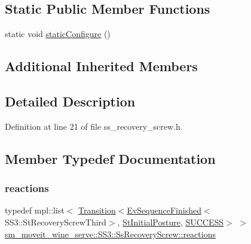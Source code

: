 \subsection*{Static Public Member Functions}
\begin{DoxyCompactItemize}
\item 
static void \hyperlink{structsm__moveit__wine__serve_1_1SS3_1_1SsRecoveryScrew_a8abad53b2989f3d9063e268b95874401}{static\+Configure} ()
\end{DoxyCompactItemize}
\subsection*{Additional Inherited Members}


\subsection{Detailed Description}


Definition at line 21 of file ss\+\_\+recovery\+\_\+screw.\+h.



\subsection{Member Typedef Documentation}
\mbox{\label{structsm__moveit__wine__serve_1_1SS3_1_1SsRecoveryScrew_ad51fd98af4a0552d56655b0f289c0bca}} 
\subsubsection{\texorpdfstring{reactions}{reactions}}
{\footnotesize\ttfamily typedef mpl\+::list$<$ \hyperlink{classsmacc_1_1Transition}{Transition}$<$\hyperlink{structsmacc_1_1default__events_1_1EvSequenceFinished}{Ev\+Sequence\+Finished}$<$S\+S3\+::\+St\+Recovery\+Screw\+Third$>$, \hyperlink{structsm__moveit__wine__serve_1_1StInitialPosture}{St\+Initial\+Posture}, \hyperlink{structsmacc_1_1default__transition__tags_1_1SUCCESS}{S\+U\+C\+C\+E\+SS}$>$ $>$ \hyperlink{structsm__moveit__wine__serve_1_1SS3_1_1SsRecoveryScrew_ad51fd98af4a0552d56655b0f289c0bca}{sm\+\_\+moveit\+\_\+wine\+\_\+serve\+::\+S\+S3\+::\+Ss\+Recovery\+Screw\+::reactions}}



